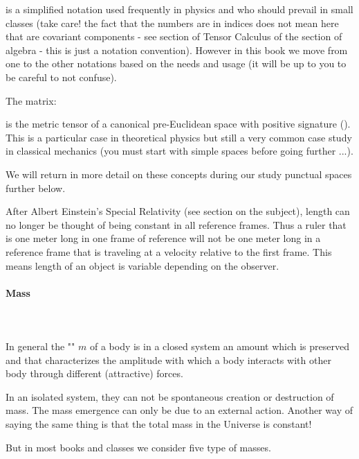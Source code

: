 	is a simplified notation used frequently in physics and who should prevail in small classes (take care! the fact that the numbers are in indices does not mean here that are covariant components - see section of Tensor Calculus of the section of algebra - this is just a notation convention). However in this book we move from one to the other notations based on the needs and usage (it will be up to you to be careful to not confuse).
	
	The matrix:
	
	is the metric tensor of a canonical pre-Euclidean space with positive signature (). This is a particular case in theoretical physics but still a very common case study in classical mechanics (you must start with simple spaces before going further ...).

	We will return in more detail on these concepts during our study punctual spaces further below.
	
	After Albert Einstein's Special Relativity (see section on the subject), length can no longer be thought of being constant in all reference frames. Thus a ruler that is one meter long in one frame of reference will not be one meter long in a reference frame that is traveling at a velocity relative to the first frame. This means length of an object is variable depending on the observer.
	
	\paragraph{Mass}\mbox{}\\\\
	In general the "" $m$ of a body is in a closed system an amount which is preserved and that characterizes the amplitude with which a body interacts with other body through different (attractive) forces.
	
	\begin{tcolorbox}[title=Remarks,colframe=black,arc=10pt]
	In an isolated system, they can not be spontaneous creation or destruction of mass. The mass emergence can only be due to an external action. Another way of saying the same thing is that the total mass in the Universe is constant!
	\end{tcolorbox}
	
	But in most books and classes we consider five type of masses.

